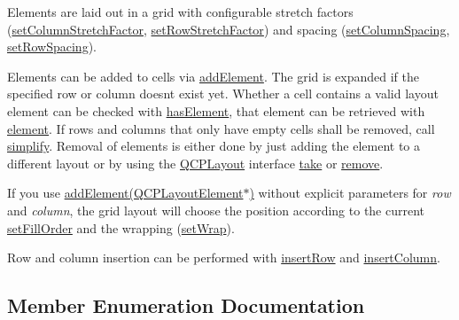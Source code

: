 Elements are laid out in a grid with configurable stretch factors (\hyperlink{class_q_c_p_layout_grid_ae38f31a71687b9d7ee3104852528fb50}{set\+Column\+Stretch\+Factor}, \hyperlink{class_q_c_p_layout_grid_a7b0273de5369bd93d942edbaf5b166ec}{set\+Row\+Stretch\+Factor}) and spacing (\hyperlink{class_q_c_p_layout_grid_a3a49272aba32bb0fddc3bb2a45a3dba0}{set\+Column\+Spacing}, \hyperlink{class_q_c_p_layout_grid_aaef2cd2d456197ee06a208793678e436}{set\+Row\+Spacing}).

Elements can be added to cells via \hyperlink{class_q_c_p_layout_grid_adff1a2ca691ed83d2d24a4cd1fe17012}{add\+Element}. The grid is expanded if the specified row or column doesn\textquotesingle{}t exist yet. Whether a cell contains a valid layout element can be checked with \hyperlink{class_q_c_p_layout_grid_ab0cf4f7edc9414a3bfaddac0f46dc0a0}{has\+Element}, that element can be retrieved with \hyperlink{class_q_c_p_layout_grid_a602b426609b4411cf6a93c3ddf3a381a}{element}. If rows and columns that only have empty cells shall be removed, call \hyperlink{class_q_c_p_layout_grid_a38621ca7aa633b6a9a88617df7f08672}{simplify}. Removal of elements is either done by just adding the element to a different layout or by using the \hyperlink{class_q_c_p_layout}{Q\+C\+P\+Layout} interface \hyperlink{class_q_c_p_layout_grid_aee961c2eb6cf8a85dcbc5a7d7b6c1a00}{take} or \hyperlink{class_q_c_p_layout_a6c58f537d8086f352576ab7c5b15d0bc}{remove}.

If you use \hyperlink{class_q_c_p_layout_grid_a4c44025dd25acd27e053cadfd448ad7b}{add\+Element(\+Q\+C\+P\+Layout\+Element$\ast$)} without explicit parameters for {\itshape row} and {\itshape column}, the grid layout will choose the position according to the current \hyperlink{class_q_c_p_layout_grid_affc2f3cfd22f28698c5b29b960d2a391}{set\+Fill\+Order} and the wrapping (\hyperlink{class_q_c_p_layout_grid_ab36af18d77e4428386d02970382ee598}{set\+Wrap}).

Row and column insertion can be performed with \hyperlink{class_q_c_p_layout_grid_a48af3dd7c3a653d9c3d7dd99bd02e838}{insert\+Row} and \hyperlink{class_q_c_p_layout_grid_a1e880a321dbe8b43b471ccd764433dc4}{insert\+Column}. 

\subsection{Member Enumeration Documentation}
\mbox{\label{class_q_c_p_layout_grid_a7d49ee08773de6b2fd246edfed353cca}} 
